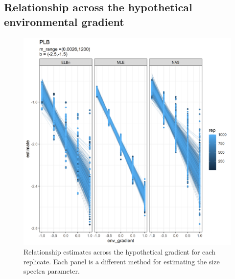 \documentclass[
]{article}
\begin{document}
\hypertarget{relationship-across-the-hypothetical-environmental-gradient}{%
\subsection{Relationship across the hypothetical environmental
gradient}\label{relationship-across-the-hypothetical-environmental-gradient}}

\begin{figure}
\centering
\includegraphics{figures/PLB_sim_main.png}
\caption{Relationship estimates across the hypothetical gradient for
each replicate. Each panel is a different method for estimating the size
spectra parameter.}
\end{figure}
\end{document}
